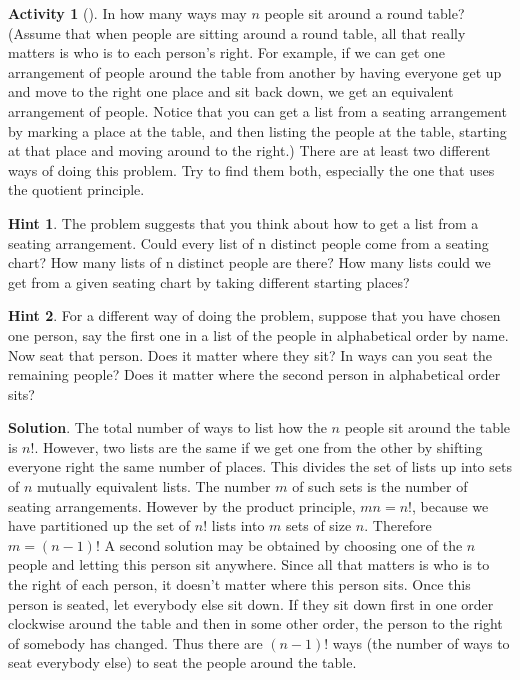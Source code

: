 \documentclass[10pt,]{book}
\theoremstyle{plain}
\theoremstyle{definition}
\theoremstyle{definition}
\theoremstyle{definition}
\newtheorem{activity}[project]{Activity}
\theoremstyle{definition}
\numberwithin{equation}{chapter}
\begin{document}
\begin{activity}[]\label{roundtable}
\hypertarget{p-668}{}%
In how many ways may \(n\) people sit around a round table? (Assume that when people are sitting around a round table, all that really matters is who is to each person's right. For example, if we can get one arrangement of people around the table from another by having everyone get up and move to the right one place and sit back down, we get an equivalent arrangement of people. Notice that you can get a list from a seating arrangement by marking a place at the table, and then listing the people at the table, starting at that place and moving around to the right.) There are at least two different ways of doing this problem. Try to find them both, especially the one that uses the quotient principle.%
\par\smallskip%
\noindent\textbf{Hint 1}.\hypertarget{hint-40}{}\quad%
\hypertarget{p-669}{}%
The problem suggests that you think about how to get a list from a seating arrangement. Could every list of n distinct people come from a seating chart? How many lists of n distinct people are there? How many lists could we get from a given seating chart by taking different starting places?%
\par\smallskip%
\noindent\textbf{Hint 2}.\hypertarget{hint-41}{}\quad%
\hypertarget{p-670}{}%
For a different way of doing the problem, suppose that you have chosen one person, say the first one in a list of the people in alphabetical order by name. Now seat that person. Does it matter where they sit? In ways can you seat the remaining people? Does it matter where the second person in alphabetical order sits?%
\par\smallskip%
\noindent\textbf{Solution}.\hypertarget{solution-59}{}\quad%
\hypertarget{p-671}{}%
The total number of ways to list how the \(n\) people sit around the table is \(n!\). However, two lists are the same if we get one from the other by shifting everyone right the same number of places. This divides the set of lists up into sets of \(n\) mutually equivalent lists. The number \(m\) of such sets is the number of seating arrangements. However by the product principle, \(mn=n!\), because we have partitioned up the set of \(n!\) lists into \(m\) sets of size \(n\). Therefore \(m=(n-1)!\) A second solution may be obtained by choosing one of the \(n\) people and letting this person sit anywhere. Since all that matters is who is to the right of each person, it doesn't matter where this person sits. Once this person is seated, let everybody else sit down. If they sit down first in one order clockwise around the table and then in some other order, the person to the right of somebody has changed. Thus there are \((n-1)!\) ways (the number of ways to seat everybody else) to seat the people around the table.%
\end{activity}
\end{document}
